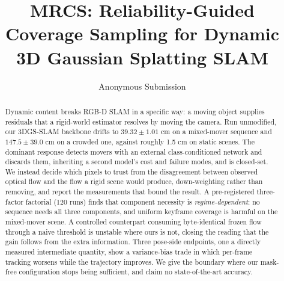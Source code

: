 \documentclass[runningheads]{llncs}
\begin{document}
\title{MRCS: Reliability-Guided Coverage Sampling for
Dynamic 3D Gaussian Splatting SLAM}
\author{Anonymous Submission}

\maketitle

\begin{abstract}
Dynamic content breaks RGB-D SLAM in a specific way: a moving object supplies residuals
that a rigid-world estimator resolves by moving the camera. Run unmodified, our
3DGS-SLAM backbone drifts to $39.32\pm1.01$ cm on a mixed-mover sequence and
$147.5\pm39.0$ cm on a crowded one, against roughly 1.5 cm on static scenes. The
dominant response detects movers with an external class-conditioned network and discards
them, inheriting a second model's cost and failure modes, and is closed-set. We instead
decide which pixels to trust from the disagreement between observed optical flow and the
flow a rigid scene would produce, down-weighting rather than removing, and report the
measurements that bound the result. A pre-registered three-factor factorial (120 runs) finds that component
necessity is \emph{regime-dependent}: no sequence needs all three components, and uniform
keyframe coverage is harmful on the mixed-mover scene. A controlled
counterpart consuming byte-identical frozen flow through a naive threshold is unstable
where ours is not, closing the reading that the gain follows from the extra information.
Three pose-side endpoints, one a directly measured intermediate quantity, show a
variance-bias trade in which per-frame tracking worsens while the trajectory improves. We
give the boundary where our mask-free configuration stops being sufficient, and claim no
state-of-the-art accuracy.

\end{abstract}





\end{document}
